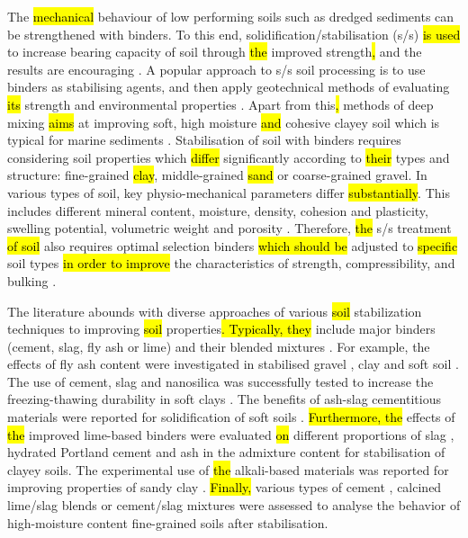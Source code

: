 \documentclass[sustainability,article,submit,pdftex,moreauthors]{Definitions/mdpi}
\begin{document}
The \hl{mechanical} behaviour of low performing soils such as dredged sediments can be strengthened with binders. To this end, solidification/stabilisation (s/s) \hl{is used }to increase bearing capacity of soil through \hl{the }improved strength\hl{, }and the results are encouraging \cite{McLeod,Yongfeng,Rashidi,Zhangetal2011}. A popular approach to s/s soil processing is to use binders as stabilising agents, and then apply geotechnical methods of evaluating \hl{its} strength and environmental properties \cite{Rios,ZHANG2022127996}. Apart from this\hl{, }methods of deep mixing \hl{aims} at improving soft, high moisture \hl{and} cohesive clayey soil which is typical for marine sediments \cite{Lindh202232,Ye}. Stabilisation of soil with binders requires considering soil properties which \hl{differ} significantly according to \hl{their} types and structure: fine-grained \hl{clay}, middle-grained \hl{sand} or coarse-grained gravel. In various types of soil, key physio-mechanical parameters differ \hl{substantially}. This includes different mineral content, moisture, density, cohesion and plasticity, swelling potential, volumetric weight and porosity \cite{Grubb,Wangetal2018}. Therefore, \hl{the }s/s treatment \hl{of soil }also requires optimal selection binders \hl{which should be }adjusted to \hl{specific }soil types \hl{in order to improve} the characteristics of strength, compressibility, and bulking \cite{Grubbetal2010}. 

The literature abounds with diverse approaches of various \hl{soil }stabilization techniques to improving \hl{soil} properties\hl{. Typically, they} include major binders (cement, slag, fly ash or lime) and their blended mixtures \cite{Nguyen,Couvidat,Puetal2021}. For example, the effects of fly ash content were investigated in stabilised gravel \cite{Nordmark}, clay \cite{Min} and soft soil \cite{Taj}. The use of cement, slag and nanosilica was successfully tested to increase the freezing-thawing durability in soft clays \cite{Eissa}. The benefits of ash-slag cementitious materials were reported for solidification of soft soils \cite{ShuJing}. \hl{Furthermore, the} effects of \hl{the }improved lime-based binders were evaluated\hl{ on} different proportions of slag \cite{Muthukkumaran}, hydrated Portland cement \cite{app11031080,Lindh202226} and ash \cite{Lietal2019} in the admixture content for stabilisation of clayey soils. The experimental use of \hl{the }alkali-based materials was reported for improving properties of sandy clay \cite{CORREASILVA2021106260}. \hl{Finally, }various types of cement \cite{Bazne,Lietal2016}, calcined lime/slag blends \cite{Gu} or cement/slag mixtures \cite{Lindh202222} were assessed to analyse the behavior of high-moisture content fine-grained soils after stabilisation. 
\end{document}
